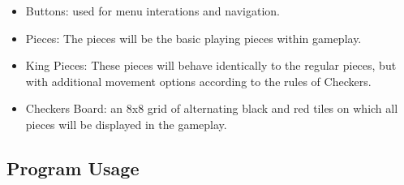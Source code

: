 \documentclass[10pt]{article}
\begin{document}
\begin{itemize}
    \item Buttons: used for menu interations and navigation.
    \item Pieces: The pieces will be the basic playing pieces within gameplay.
    \item King Pieces: These pieces will behave identically to the regular pieces, but with additional movement options according to the rules of Checkers.
    \item Checkers Board: an 8x8 grid of alternating black and red tiles on which all pieces will be displayed in the gameplay.
\end{itemize}

\subsection{Program Usage}
\end{document}
